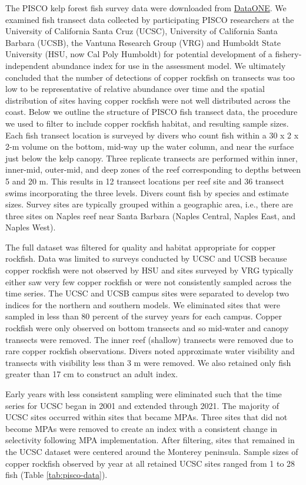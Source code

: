 \documentclass[11pt,
  letterpaper,
]{article}
\begin{document}
The PISCO kelp forest fish survey data were downloaded from \href{https://www.dataone.org/}{DataONE}. We examined fish transect data collected by participating PISCO researchers at the University of California Santa Cruz (UCSC), University of California Santa Barbara (UCSB), the Vantuna Research Group (VRG) and Humboldt State University (HSU, now Cal Poly Humboldt) for potential development of a fishery-independent abundance index for use in the assessment model. We ultimately concluded that the number of detections of copper rockfish on transects was too low to be representative of relative abundance over time and the spatial distribution of sites having copper rockfish were not well distributed across the coast. Below we outline the structure of PISCO fish transect data, the procedure we used to filter to include copper rockfish habitat, and resulting sample sizes. Each fish transect location is surveyed by divers who count fish within a 30 x 2 x 2-m volume on the bottom, mid-way up the water column, and near the surface just below the kelp canopy. Three replicate transects are performed within inner, inner-mid, outer-mid, and deep zones of the reef corresponding to depths between 5 and 20 m. This results in 12 transect locations per reef site and 36 transect swims incorporating the three levels. Divers count fish by species and estimate sizes. Survey sites are typically grouped within a geographic area, i.e., there are three sites on Naples reef near Santa Barbara (Naples Central, Naples East, and Naples West).

The full dataset was filtered for quality and habitat appropriate for copper rockfish. Data was limited to surveys conducted by UCSC and UCSB because copper rockfish were not observed by HSU and sites surveyed by VRG typically either saw very few copper rockfish or were not consistently sampled across the time series. The UCSC and UCSB campus sites were separated to develop two indices for the northern and southern models. We eliminated sites that were sampled in less than 80 percent of the survey years for each campus. Copper rockfish were only observed on bottom transects and so mid-water and canopy transects were removed. The inner reef (shallow) transects were removed due to rare copper rockfish observations. Divers noted approximate water visibility and transects with visibility less than 3 m were removed. We also retained only fish greater than 17 cm to construct an adult index.

Early years with less consistent sampling were eliminated such that the time series for UCSC began in 2001 and extended through 2021. The majority of UCSC sites occurred within sites that became MPAs. Three sites that did not become MPAs were removed to create an index with a consistent change in selectivity following MPA implementation. After filtering, sites that remained in the UCSC dataset were centered around the Monterey peninsula. Sample sizes of copper rockfish observed by year at all retained UCSC sites ranged from 1 to 28 fish (Table \ref{tab:pisco-data}).
\end{document}
